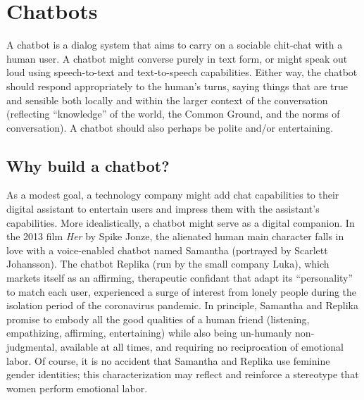 





\section{Chatbots}

A chatbot is a dialog system that aims to carry on a sociable chit-chat with a human user.  A chatbot might converse purely in text form, or might speak out loud using speech-to-text and text-to-speech capabilities. Either way, the chatbot should respond appropriately to the human's turns, saying things that are true and sensible both locally and within the larger context of the conversation (reflecting ``knowledge'' of the world, the Common Ground, and the norms of conversation).  A chatbot should also perhaps be polite and/or entertaining.


\subsection{Why build a chatbot?}

As a modest goal, a technology company  might  add chat capabilities to their digital assistant to entertain users and impress them with the assistant's capabilities.
More idealistically, a chatbot might serve as a digital companion.  In the 2013  film \textit{Her} by Spike Jonze, the alienated human main character  falls in love with a voice-enabled chatbot named Samantha (portrayed by Scarlett Johansson).  The chatbot Replika (run by the small company Luka), which markets itself as an affirming, therapeutic confidant that adapt its ``personality'' to match each user,  experienced a surge of interest from lonely people during the isolation period of the coronavirus pandemic.  In principle, Samantha and Replika promise to embody all the good qualities of a human friend (listening, empathizing, affirming, entertaining) while also being un-humanly non-judgmental, available  at all times, and requiring no reciprocation of emotional labor. 
Of course, it is no accident that Samantha and Replika use feminine gender identities;  this characterization may reflect and reinforce a stereotype that women perform emotional labor.


